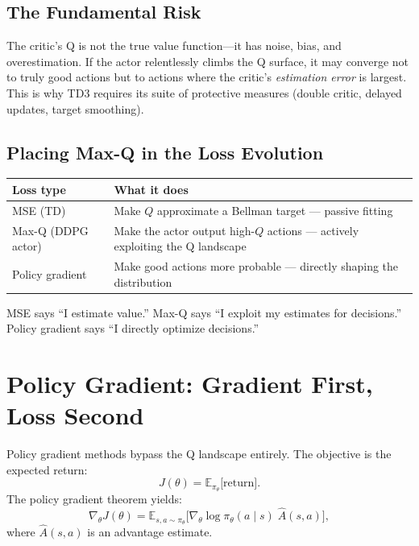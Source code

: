 \subsection{The Fundamental Risk}

The critic's Q is not the true value function---it has noise, bias, and overestimation. If the actor relentlessly climbs the Q surface, it may converge not to truly good actions but to actions where the critic's \emph{estimation error} is largest. This is why TD3 requires its suite of protective measures (double critic, delayed updates, target smoothing).

\subsection{Placing Max-Q in the Loss Evolution}

\begin{center}
\begin{tabular}{@{} l l @{}}
\toprule
\textbf{Loss type} & \textbf{What it does} \\
\midrule
MSE (TD) & Make $Q$ approximate a Bellman target --- passive fitting \\
Max-Q (DDPG actor) & Make the actor output high-$Q$ actions --- actively exploiting the Q landscape \\
Policy gradient & Make good actions more probable --- directly shaping the distribution \\
\bottomrule
\end{tabular}
\end{center}

MSE says ``I estimate value.'' Max-Q says ``I exploit my estimates for decisions.'' Policy gradient says ``I directly optimize decisions.''

\section{Policy Gradient: Gradient First, Loss Second}
\label{sec:pg-loss}

Policy gradient methods bypass the Q landscape entirely. The objective is the expected return:
\begin{equation}
  J(\theta) = \mathbb{E}_{\pi_\theta}\!\bigl[\text{return}\bigr].
\end{equation}
The policy gradient theorem yields:
\begin{equation}
  \nabla_\theta J(\theta)
  = \mathbb{E}_{s,a\sim\pi_\theta}\!\bigl[
    \nabla_\theta \log\pi_\theta(a\mid s)\;\hat{A}(s,a)
  \bigr],
  \label{eq:pg}
\end{equation}
where $\hat{A}(s,a)$ is an advantage estimate.

